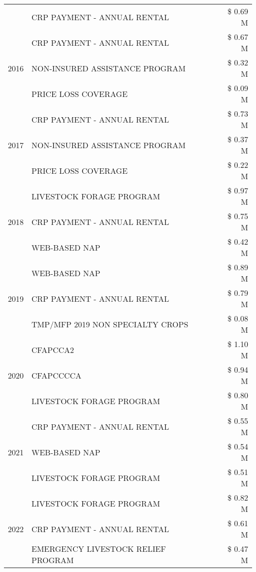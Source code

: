 \begin{tabular}{llr}
 & CRP PAYMENT - ANNUAL RENTAL & \$ 0.69 M \\
\cline{1-3}
\multirow[t]{3}{*}{2016} & CRP PAYMENT - ANNUAL RENTAL & \$ 0.67 M \\
 & NON-INSURED ASSISTANCE PROGRAM & \$ 0.32 M \\
 & PRICE LOSS COVERAGE & \$ 0.09 M \\
\cline{1-3}
\multirow[t]{3}{*}{2017} & CRP PAYMENT - ANNUAL RENTAL & \$ 0.73 M \\
 & NON-INSURED ASSISTANCE PROGRAM & \$ 0.37 M \\
 & PRICE LOSS COVERAGE & \$ 0.22 M \\
\cline{1-3}
\multirow[t]{3}{*}{2018} & LIVESTOCK FORAGE PROGRAM & \$ 0.97 M \\
 & CRP PAYMENT - ANNUAL RENTAL & \$ 0.75 M \\
 & WEB-BASED NAP & \$ 0.42 M \\
\cline{1-3}
\multirow[t]{3}{*}{2019} & WEB-BASED NAP & \$ 0.89 M \\
 & CRP PAYMENT - ANNUAL RENTAL & \$ 0.79 M \\
 & TMP/MFP 2019 NON SPECIALTY CROPS & \$ 0.08 M \\
\cline{1-3}
\multirow[t]{3}{*}{2020} & CFAPCCA2 & \$ 1.10 M \\
 & CFAPCCCCA & \$ 0.94 M \\
 & LIVESTOCK FORAGE PROGRAM & \$ 0.80 M \\
\cline{1-3}
\multirow[t]{3}{*}{2021} & CRP PAYMENT - ANNUAL RENTAL & \$ 0.55 M \\
 & WEB-BASED NAP & \$ 0.54 M \\
 & LIVESTOCK FORAGE PROGRAM & \$ 0.51 M \\
\cline{1-3}
\multirow[t]{3}{*}{2022} & LIVESTOCK FORAGE PROGRAM & \$ 0.82 M \\
 & CRP PAYMENT - ANNUAL RENTAL & \$ 0.61 M \\
 & EMERGENCY LIVESTOCK RELIEF PROGRAM & \$ 0.47 M \\
\cline{1-3}
\bottomrule
\end{tabular}
